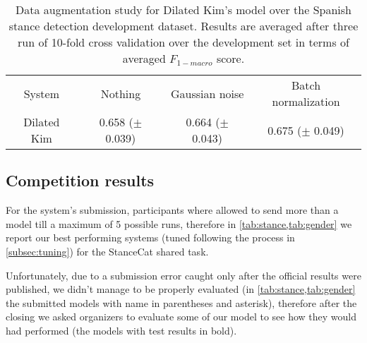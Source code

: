 \begin{table}[h]
	\centering
	\caption{Data augmentation study for Dilated Kim's model over the Spanish stance detection development dataset. Results are averaged after three run of 10-fold cross validation over the development set in terms of averaged $F_{1-macro}$ score. }
	\label{tab:augmentation}
	\begin{tabular}{c|ccc}
		\hline\noalign{\smallskip}
		System		& Nothing	& Gaussian noise	& Batch normalization	\\
		\noalign{\smallskip}
		\hline
		\noalign{\smallskip}
		Dilated Kim	& 0.658 ($\pm$ 0.039) & 0.664 ($\pm$ 0.043)	& 0.675 ($\pm$ 0.049)	\\
		\hline
	\end{tabular}
\end{table}

\subsection{Competition results} \label{subsec:results}

For the system's submission, participants where allowed to send more than a model till a maximum of 5 possible runs, therefore in \cref{tab:stance,tab:gender} we report our best performing systems (tuned following the process in \cref{subsec:tuning}) for the StanceCat shared task.

Unfortunately, due to a submission error caught only after the official results were published, we didn't manage to be properly evaluated (in \cref{tab:stance,tab:gender} the submitted models with name in parentheses and asterisk), therefore after the closing we asked organizers to evaluate some of our model to see how they would had performed (the models with test results in bold).

